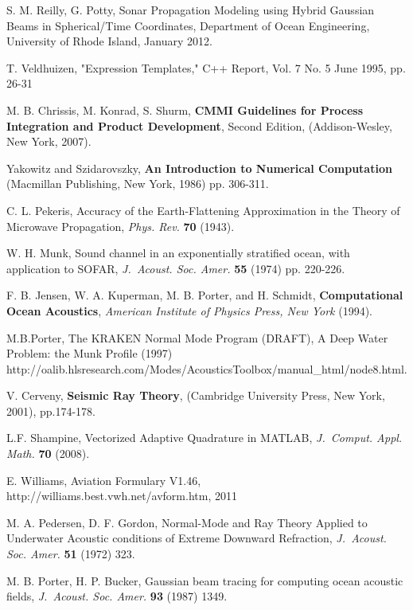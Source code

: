 \documentclass{ws-jca}
\begin{document}
\begin{thebibliography}{0}

 S. M. Reilly, G. Potty, Sonar Propagation Modeling using Hybrid
Gaussian Beams in Spherical/Time Coordinates, Department of Ocean Engineering, University of Rhode Island, January 2012.

 T. Veldhuizen, "Expression Templates," C++ Report,
Vol. 7 No. 5 June 1995, pp. 26-31

 M. B. Chrissis, M. Konrad, S. Shurm, {\bf CMMI
Guidelines for Process Integration and Product Development}, Second
Edition, (Addison-Wesley, New York, 2007).

 Yakowitz and Szidarovszky, {\bf An Introduction to
Numerical Computation} (Macmillan Publishing, New York, 1986) pp. 306-311.

 C. L. Pekeris, Accuracy of the Earth-Flattening
Approximation in the Theory of Microwave Propagation, {\it Phys. Rev.} {\bf
70} (1943).

 W. H. Munk, Sound channel in an exponentially stratified
ocean, with application to SOFAR, {\it J.~Acoust. Soc. Amer.} {\bf 55}
(1974) pp. 220-226.

 F. B. Jensen, W. A. Kuperman, M. B. Porter, and H.
Schmidt, {\bf Computational Ocean Acoustics}, {\it American Institute of
Physics Press, New York} (1994).

 M.B.Porter, The KRAKEN Normal Mode Program (DRAFT),
A Deep Water Problem: the Munk Profile (1997)
http://oalib.hlsresearch.com/Modes/AcousticsToolbox/manual\_html/node8.html.

 V. Cerveny, {\bf Seismic Ray Theory}, (Cambridge
University Press, New York, 2001), pp.174-178.

 L.F. Shampine, Vectorized Adaptive Quadrature in
MATLAB, {\it J.~Comput. Appl. Math.} {\bf 70} (2008).

 E. Williams, Aviation Formulary V1.46,
http://williams.best.vwh.net/avform.htm, 2011

 M. A. Pedersen, D. F. Gordon, Normal-Mode and Ray
Theory Applied to Underwater Acoustic conditions of Extreme Downward
Refraction, {\it J.~Acoust. Soc. Amer.} {\bf 51} (1972) 323.

 M. B. Porter, H. P. Bucker, Gaussian beam tracing for
computing ocean acoustic fields, {\it J.~Acoust. Soc. Amer.} {\bf 93}
(1987) 1349.


\end{thebibliography}
\end{document}
